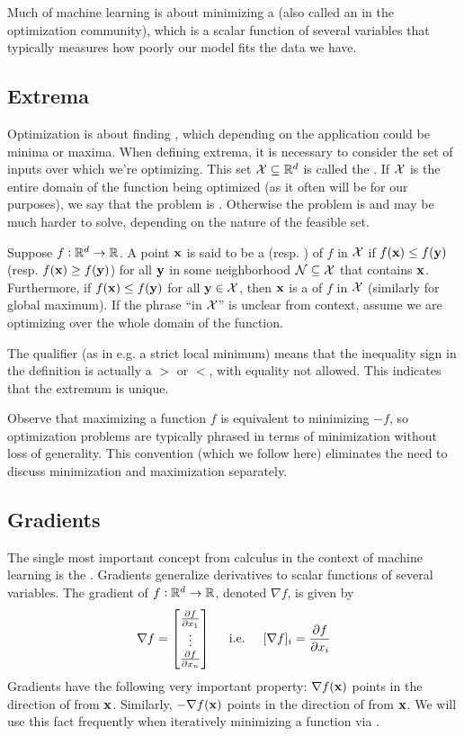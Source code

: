 Much of machine learning is about minimizing a  (also called an  in the optimization community), which is a scalar function of several variables that typically measures how poorly our model fits the data we have.

\subsection{Extrema}
Optimization is about finding , which depending on the application could be minima or maxima.
When defining extrema, it is necessary to consider the set of inputs over which we're optimizing.
This set $\mathcal{X} \subseteq \mathbb{R}^d$ is called the .
If $\mathcal{X}$ is the entire domain of the function being optimized (as it often will be for our purposes), we say that the problem is .
Otherwise the problem is  and may be much harder to solve, depending on the nature of the feasible set.

Suppose $f : \mathbb{R}^d \to \mathbb{R}$.
A point $\mathbf{x}$ is said to be a  (resp. ) of $f$ in $\mathcal{X}$ if $f(\mathbf{x}) \leq f(\mathbf{y})$ (resp. $f(\mathbf{x}) \geq f(\mathbf{y})$) for all $\mathbf{y}$ in some neighborhood $\mathcal{N} \subseteq \mathcal{X}$ that contains $\mathbf{x}$.
Furthermore, if $f(\mathbf{x}) \leq f(\mathbf{y})$ for all $\mathbf{y} \in \mathcal{X}$, then $\mathbf{x}$ is a  of $f$ in $\mathcal{X}$ (similarly for global maximum).
If the phrase ``in $\mathcal{X}$'' is unclear from context, assume we are optimizing over the whole domain of the function.

The qualifier  (as in e.g. a strict local minimum) means that the inequality sign in the definition is actually a $>$ or $<$, with equality not allowed.
This indicates that the extremum is unique.

Observe that maximizing a function $f$ is equivalent to minimizing $-f$, so optimization problems are typically phrased in terms of minimization without loss of generality.
This convention (which we follow here) eliminates the need to discuss minimization and maximization separately.

\subsection{Gradients}
The single most important concept from calculus in the context of machine learning is the .
Gradients generalize derivatives to scalar functions of several variables.
The gradient of $f : \mathbb{R}^d \to \mathbb{R}$, denoted $\nabla f$, is given by
\[\nabla f = \begin{bmatrix}\pdv{f}{x_1} \\ \vdots \\ \pdv{f}{x_n}\end{bmatrix}
\hspace{0.5cm}\text{i.e.}\hspace{0.5cm}
[\nabla f]_i = \pdv{f}{x_i}\]
Gradients have the following very important property: $\nabla f(\mathbf{x})$ points in the direction of  from $\mathbf{x}$.
Similarly, $-\nabla f(\mathbf{x})$ points in the direction of  from $\mathbf{x}$.
We will use this fact frequently when iteratively minimizing a function via .

